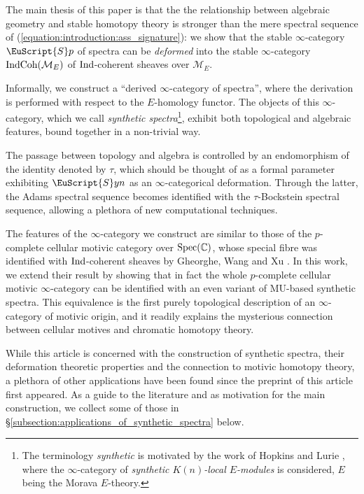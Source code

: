 \documentclass[oneside,a4paper]{amsart}
\newcommand{\euscr}[1]{\EuScript{#1}} %
\newcommand{\IndCoh}{\textnormal{IndCoh}} %
\newcommand{\Ind}{\textnormal{Ind}} %
\newcommand{\MU}{\mathrm{MU}} %
\newcommand{\spectra}{\euscr{S}p} %
\newcommand{\synspectra}{\euscr{S}yn} %
\theoremstyle{plain}
\theoremstyle{definition}
\theoremstyle{remark}
\begin{document}
The main thesis of this paper is that the the relationship between algebraic geometry and stable homotopy theory is stronger than the mere spectral sequence of (\ref{equation:introduction:ass_signature}): we show that the stable $\infty$-category $\spectra$ of spectra can be \emph{deformed} into the stable $\infty$-category $\IndCoh(\mathcal{M}_{E})$ of $\Ind$-coherent sheaves over $\mathcal{M}_{E}$. 

Informally, we construct a ``derived $\infty$-category of spectra'', where the derivation is performed with respect to the $E$-homology functor. The objects of this $\infty$-category, which we call \emph{synthetic spectra}\footnote{The terminology \emph{synthetic} is motivated by the work of Hopkins and Lurie \cite{lurie_hopkins_brauer_group}, where the $\infty$-category of \emph{synthetic $K(n)$-local $E$-modules} is considered, $E$ being the Morava $E$-theory.}, exhibit both topological and algebraic features, bound together in a non-trivial way. 

The passage between topology and algebra is controlled by an endomorphism of the identity denoted by $\tau$, which should be thought of as a formal parameter exhibiting $\synspectra$ as an $\infty$-categorical deformation. Through the latter, the Adams spectral sequence 
becomes identified with the $\tau$-Bockstein spectral sequence, allowing a plethora of new computational techniques. 

The features of the $\infty$-category we construct are similar to those of the $p$-complete cellular motivic category over $\textnormal{Spec}(\mathbb{C})$, whose special fibre was identified with $\Ind$-coherent sheaves by Gheorghe, Wang and Xu \cite{gheorghe2018special}. In this work, we extend their result by showing that in fact the whole $p$-complete cellular motivic $\infty$-category can be identified with an even variant of $\MU$-based synthetic spectra. This equivalence is the first purely topological description of an $\infty$-category of motivic origin, and it readily explains the mysterious connection between cellular motives and chromatic homotopy theory. 

While this article is concerned with the construction of synthetic spectra, their deformation theoretic properties and the connection to motivic homotopy theory, a plethora of other applications have been found since the preprint of this article first appeared. As a guide to the literature and as motivation for the main construction, we collect some of those in \S\ref{subsection:applications_of_synthetic_spectra} below. 
\end{document}
